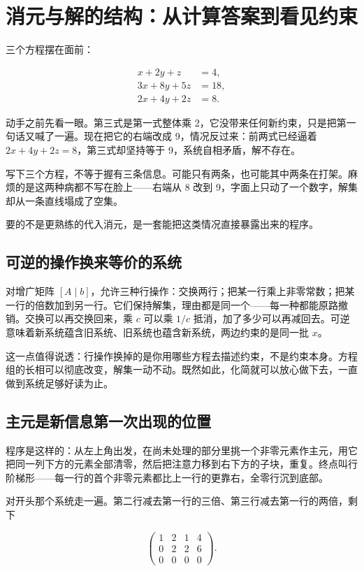 \section{消元与解的结构：从计算答案到看见约束}
\label{sec:03-Linear-Algebra/01-Linear-Systems-and-Matrices/02}

三个方程摆在面前：

\[
\begin{aligned}
x+2y+z&=4,\\
3x+8y+5z&=18,\\
2x+4y+2z&=8.
\end{aligned}
\]

动手之前先看一眼。第三式是第一式整体乘 2，它没带来任何新约束，只是把第一句话又喊了一遍。现在把它的右端改成 9，情况反过来：前两式已经逼着 \(2x+4y+2z=8\)，第三式却坚持等于 9，系统自相矛盾，解不存在。

写下三个方程，不等于握有三条信息。可能只有两条，也可能其中两条在打架。麻烦的是这两种病都不写在脸上——右端从 8 改到 9，字面上只动了一个数字，解集却从一条直线塌成了空集。

要的不是更熟练的代入消元，是一套能把这类情况直接暴露出来的程序。

\subsection{可逆的操作换来等价的系统}

对增广矩阵 \([A\mid b]\)，允许三种行操作：交换两行；把某一行乘上非零常数；把某一行的倍数加到另一行。它们保持解集，理由都是同一个——每一种都能原路撤销。交换可以再交换回来，乘 \(c\) 可以乘 \(1/c\) 抵消，加了多少可以再减回去。可逆意味着新系统蕴含旧系统、旧系统也蕴含新系统，两边约束的是同一批 \(x\)。

这一点值得说透：行操作换掉的是你用哪些方程去描述约束，不是约束本身。方程组的长相可以彻底改变，解集一动不动。既然如此，化简就可以放心做下去，一直做到系统足够好读为止。

\subsection{主元是新信息第一次出现的位置}

程序是这样的：从左上角出发，在尚未处理的部分里挑一个非零元素作主元，用它把同一列下方的元素全部清零，然后把注意力移到右下方的子块，重复。终点叫行阶梯形——每一行的首个非零元素都比上一行的更靠右，全零行沉到底部。

对开头那个系统走一遍。第二行减去第一行的三倍、第三行减去第一行的两倍，剩下

\[
\left(
\begin{array}{ccc|c}
1&2&1&4\\
0&2&2&6\\
0&0&0&0
\end{array}
\right).
\]

